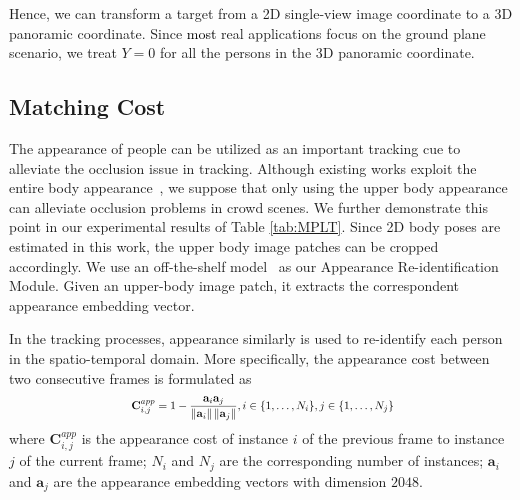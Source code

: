 \documentclass{article}
\newcommand{\YangProof}[1]{\textcolor{black}{#1}}
\begin{document}
Hence, we can transform a target from a 2D single-view image coordinate to a 3D panoramic coordinate. Since \YangProof{most} real applications focus on the ground plane scenario, we treat $Y=0$ for all the persons in the 3D panoramic coordinate.


\subsection{Matching Cost}
The appearance of people can be utilized as an important tracking cue to alleviate the occlusion issue in tracking. Although existing works exploit the entire body appearance~\cite{yu2016poi, wojke2017simple}, we suppose that only using the upper body appearance can alleviate occlusion problems in crowd scenes. We further demonstrate this point in our experimental results of Table \ref{tab:MPLT}. Since 2D body poses are estimated in this work, the upper body image patches can be cropped accordingly.  We use an off-the-shelf model~\cite{Luo_2019_CVPR_Workshops} as our Appearance Re-identification Module. Given an upper-body image patch, it extracts the correspondent appearance embedding vector. 

In the tracking processes, appearance similarly is used to re-identify each person in the spatio-temporal domain. More specifically, the appearance cost between two consecutive frames is formulated as
\begin{equation}
\label{eq:app}
\scalebox{0.8}{
\begin{math}
\begin{split}
\mathbf{C}^{app}_{i,j} = 1-\frac{\mathbf{a}_{i}\mathbf{a}_{j}}{\left \| \mathbf{a}_{i} \right \| \left \| \mathbf{a}_{j} \right \|}, i\in \{1,\dots, N_i\}, j\in \{1,\dots, N_j\}
\end{split}
\end{math}}
\end{equation}
where $\mathbf{C}^{app}_{i,j}$ is the appearance cost of instance $i$ of the previous frame to instance $j$ of the current frame; $N_i$ and $N_j$ are the corresponding number of instances; $\mathbf{a}_{i}$ and $\mathbf{a}_{j}$ are the appearance embedding vectors with dimension $2048$.
\end{document}
